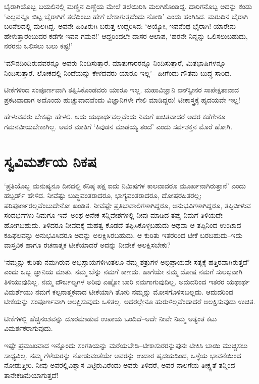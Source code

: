 ಬೈರಾಗಿಯೊಬ್ಬ ಬಯಲಿನಲ್ಲಿ ಮಣ್ಣಿನ ದಿಣ್ಣೆಯ ಮೇಲೆ ತಲೆಯಿರಿಸಿ ಮಲಗಿಕೊಂಡಿದ್ದ. ದಾರಿಗನೊಬ್ಬ ಅದನ್ನು ಕಂಡು ‘ಎಲ್ಲವನ್ನೂ ಬಿಟ್ಟ ಬೈರಾಗಿಗೆ ತಲೆದಿಂಬು ಹೇಗೆ ಬೇಕಾಗುತ್ತದೆಂದು ನೋಡಿ’ ಎಂದು ಹಂಗಿಸಿದ. ಮರುದಿನ ಬೈರಾಗಿ ಬರಿನೆಲದಲ್ಲಿ ಮಲಗಿದ್ದ. ಅವನೇ ಹಿಂತಿರುಗಿ ಬರುತ್ತ ಉದ್ಗರಿಸಿದ: ‘ಅಯ್ಯೋ, ಇವನೆಂಥ ಭೈರಾಗಿ! ಯಾರೇನು ಹೇಳುತ್ತಾರೆಂಬುದರ ಕಡೆಗೇ ಇವನ ಗಮನ!’ ಆದ್ದರಿಂದಲೇ ದಾಸರ ಆಲಾಪ, ‘ಹರನೇ ನಿನ್ನನ್ನು ಒಲಿಸಲುಬಹುದು, ನರರನು ಒಲಿಸಲು ಬಲು ಕಷ್ಟ!’

‘ಮೌನದಿಂದಿರುವವರನ್ನೂ ಅವರು ನಿಂದಿಸುತ್ತಾರೆ. ಮಾತುಗಾರರನ್ನೂ ನಿಂದಿಸುತ್ತಾರೆ, ಮಿತಭಾಷಿಗಳನ್ನೂ ನಿಂದಿಸುತ್ತಾರೆ. ಲೋಕದಲ್ಲಿ ನಿಂದೆಯನ್ನು ಕೇಳದವರು ಯಾರೂ ಇಲ್ಲ’– ಹೀಗೆಂದು ಗೌತಮ ಬುದ್ಧ ಸಾರಿದ.

ಟೀಕೆಗಳಿಂದ ಸಂಪೂರ್ಣವಾಗಿ ತಪ್ಪಿಸಿಕೊಂಡವರು ಯಾರೂ ಇಲ್ಲ. ಮಹಾವಿಜ್ಞಾನಿ ಐನ್‍ಸ್ಟೀನರ ಸಾಪೇಕ್ಷತಾವಾದ ಪ್ರಕಟವಾದಾಗ ಅದೊಂದು ಹುಚ್ಚುವಾದವೆಂದು ವಿಜ್ಞಾನಿಗಳೇ ಗೇಲಿ ಮಾಡಿದ್ದರು! ಟೀಕಾಸ್ತ್ರಕ್ಕೆ ಹೃದಯವೇ ಇಲ್ಲ!

ಹೇಳುವವರು ಬೇಕಷ್ಟು ಹೇಳಲಿ. ಅದು ಯಥಾರ್ಥವಲ್ಲವೆಂದು ನಿಮಗೆ ಖಚಿತವಾದರೆ ಅದರ ಕಡೆಗೇನೂ ಗಮನವೀಯಬೇಕಾಗಿಲ್ಲ. ಅವರ ಮಾತಿಗೆ ‘ಕಿವುಡನ ಮಾಡಯ್ಯ ತಂದೆ’ ಎಂದು ಸರ್ವಶಕ್ತನ ಮೊರೆ ಹೋಗಿ.


\section*{ಸ್ವವಿಮರ್ಶೆಯ ನಿಕಷ}


‘ಪ್ರತಿಯೊಬ್ಬ ಮನುಷ್ಯನೂ ದಿನದಲ್ಲಿ ಕನಿಷ್ಠ ಪಕ್ಷ ಐದು ನಿಮಿಷಗಳ ಕಾಲವಾದರೂ ಮೂರ್ಖ\-ನಾಗಿರು\-ತ್ತಾನೆ’ ಎಂದು ಹಬ್ಬರ್ಡ್ ಹೇಳಿದ. ನೀವೆಷ್ಟು ಬುದ್ಧಿವಂತರಾದರೂ, ಭಾಗ್ಯವಂತರಾದರೂ, ದೋಷರಹಿತರಲ್ಲ; ಪರಿಪೂರ್ಣರಲ್ಲವೆಂಬುದೇನೋ ಖಂಡಿತ. ನೀವೆಷ್ಟೇ ಪ್ರತಿಭಾಶಾಲಿ\-ಗಳಾಗಿ\-ದ್ದರೂ, ಅನುಭವಿಗಳಾಗಿದ್ದರೂ, ತಪ್ಪಿಬೀಳುವ ಸಂದರ್ಭಗಳು ನಿಮಗೂ ಇವೆ–ಅಂಥ ಅನೇಕ ಸನ್ನಿವೇಶಗಳಲ್ಲಿ ನೀವು ಮಾಡಿದ ತಪ್ಪು ನಿಮಗೆ ತಿಳಿಯದೇ ಹೋಗಬಹುದು. ತಿಳಿದರೂ ನೀವದಕ್ಕೆ ಮಹತ್ವ ಕೊಡದೆ ತಪ್ಪಿಸಿಕೊಳ್ಳಬಹುದು ಅಥವಾ ಆ ತಪ್ಪಿನಿಂದ ಉಂಟಾದ ಕಹಿಫಲವನ್ನು ಅನುಭವಿಸಿದರೂ ಅದನ್ನು ಅಲಕ್ಷಿಸಿರಬಹುದು. ಆ ಕುರಿತು ಇತರರಿಂದ ಟೀಕೆ ಬರಬಹುದು–ಇದು ವಾಸ್ತವಿಕ ಹಾಗೂ ರಚನಾತ್ಮಕ ಟೀಕೆಯಾದರೆ ಅದನ್ನು ನೀವೇಕೆ ಅಲಕ್ಷಿಸಬೇಕು?

‘ನಮ್ಮನ್ನು ಕುರಿತು ನಮಗಿರುವ ಅಭಿಪ್ರಾಯಗಳಿಗಿಂತಲೂ ನಮ್ಮ ಶತ್ರುಗಳ ಅಭಿಪ್ರಾಯವೇ ಸತ್ಯಕ್ಕೆ ಹತ್ತಿರವಾಗಿರುತ್ತದೆ’ ಎಂದು ಒಬ್ಬ ಜ್ಞಾನಿಯ ಮಾತು. ನಮ್ಮ ಬೆನ್ನು ನಮಗೆ ಕಾಣದು. ಹಾಗೆಯೇ ನಮ್ಮ ದೋಷ ನಮಗೆ ಸುಲಭವಾಗಿ ತಿಳಿಯುವುದಿಲ್ಲ. ನಮ್ಮ ದೌರ್ಬಲ್ಯಗಳ ಅರಿವು ಎಷ್ಟೋ ಬಾರಿ ನಮಗಾಗುವುದಿಲ್ಲ. ಅದುದರಿಂದ ಇತರರ ಯಥಾರ್ಥ ವಿಮರ್ಶೆಯು ನಮಗೆ ಕಲ್ಪನಾತ್ಮಕವಾದ ಟೀಕೆಯಾಗಿ ತೋರಿ ನಮ್ಮನ್ನು ಮೋಸಗೊಳಿಸಬಲ್ಲದು. ಆದುದರಿಂದ ಟೀಕೆಯನ್ನು ಸಂಪೂರ್ಣವಾಗಿ ಅಲಕ್ಷಿಸುವುದು ಒಳಿತಲ್ಲ. ಅದರಲ್ಲೇನೂ ಹುರುಳಿಲ್ಲವೆಂದಾದರೆ ಅಲಕ್ಷಿಸುವುದು ಉಚಿತ.

ಟೀಕೆಗಳಲ್ಲಿ ಹೆಚ್ಚಿನಂಶವನ್ನು ದೂರಮಾಡುವ ಉಪಾಯ ಒಂದಿದೆ–ಅದೇ ನೀವೇ ನಿಮ್ಮ ಅತ್ಯಂತ ಕಟು ವಿಮರ್ಶಕರಾಗುವುದು.

ಇಷ್ಟೇ ಪ್ರಮುಖವಾದ ಇನ್ನೊಂದು ಸಂಗತಿಯನ್ನು ಮರೆಯಬೇಡಿ–ಟೀಕಾಸುರರನ್ನು\break ಪುನಃ ಟೀಕಿಸಿ ಬಾಯಿ ಮುಚ್ಚಿಸಲು ಸಾಧ್ಯವಿಲ್ಲ. ನಮ್ಮ ಗೆಳೆಯರನ್ನು ನೋಡುವಂತೆಯೇ ಅವರನ್ನು ಉದಾರ ಹೃದಯದಿಂದ, ಒಳ್ಳೆಯ ಭಾವನೆಯಿಂದ ನೋಡುತ್ತೀರಿ. ನೀವು \hbox\bgroup ಅವರಲ್ಲಿ\egroup\break ವಿಶ್ವಾಸ ವಿಟ್ಟಿರುವಿರೆಂದು ಅವರು ತಿಳಿದರೆ, ಅವರ ನಾಲಗೆಯ ತೀಕ್ಷ್ಣತೆ ತನ್ನಿಂದ ತಾನೇ\break ಕಡಿಮೆ\-ಯಾಗುತ್ತದೆ!

